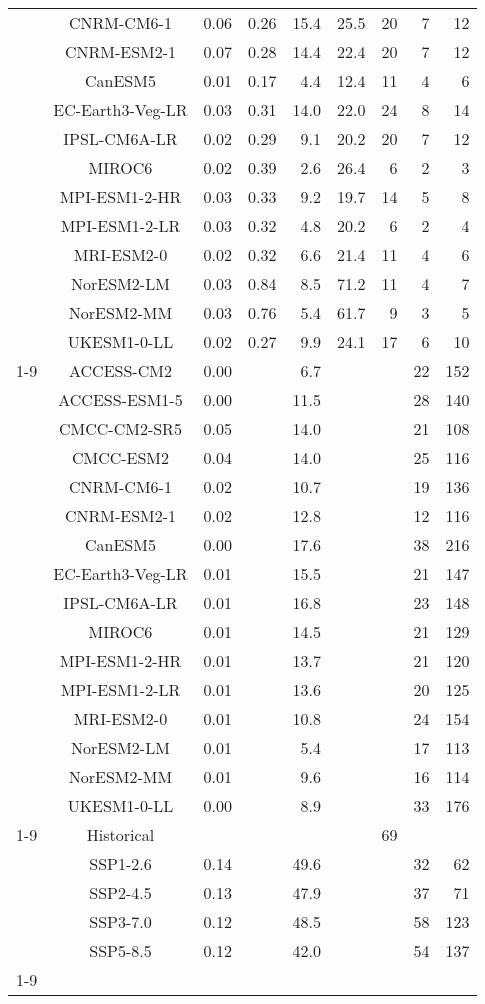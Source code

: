 \begin{table*}[t]
\begin{tabular}{c|c|rr|rr|rrr}
 & CNRM-CM6-1 & 0.06 & 0.26 & 15.4 & 25.5 & 20 & 7 & 12 \\
 & CNRM-ESM2-1 & 0.07 & 0.28 & 14.4 & 22.4 & 20 & 7 & 12 \\
 & CanESM5 & 0.01 & 0.17 & 4.4 & 12.4 & 11 & 4 & 6 \\
 & EC-Earth3-Veg-LR & 0.03 & 0.31 & 14.0 & 22.0 & 24 & 8 & 14 \\
 & IPSL-CM6A-LR & 0.02 & 0.29 & 9.1 & 20.2 & 20 & 7 & 12 \\
 & MIROC6 & 0.02 & 0.39 & 2.6 & 26.4 & 6 & 2 & 3 \\
 & MPI-ESM1-2-HR & 0.03 & 0.33 & 9.2 & 19.7 & 14 & 5 & 8 \\
 & MPI-ESM1-2-LR & 0.03 & 0.32 & 4.8 & 20.2 & 6 & 2 & 4 \\
 & MRI-ESM2-0 & 0.02 & 0.32 & 6.6 & 21.4 & 11 & 4 & 6 \\
 & NorESM2-LM & 0.03 & 0.84 & 8.5 & 71.2 & 11 & 4 & 7 \\
 & NorESM2-MM & 0.03 & 0.76 & 5.4 & 61.7 & 9 & 3 & 5 \\
 & UKESM1-0-LL & 0.02 & 0.27 & 9.9 & 24.1 & 17 & 6 & 10 \\
\cline{1-9}
\multirow[c]{16}{*}{Scenario uncertainty} & ACCESS-CM2 & 0.00 &  & 6.7 &  &  & 22 & 152 \\
 & ACCESS-ESM1-5 & 0.00 &  & 11.5 &  &  & 28 & 140 \\
 & CMCC-CM2-SR5 & 0.05 &  & 14.0 &  &  & 21 & 108 \\
 & CMCC-ESM2 & 0.04 &  & 14.0 &  &  & 25 & 116 \\
 & CNRM-CM6-1 & 0.02 &  & 10.7 &  &  & 19 & 136 \\
 & CNRM-ESM2-1 & 0.02 &  & 12.8 &  &  & 12 & 116 \\
 & CanESM5 & 0.00 &  & 17.6 &  &  & 38 & 216 \\
 & EC-Earth3-Veg-LR & 0.01 &  & 15.5 &  &  & 21 & 147 \\
 & IPSL-CM6A-LR & 0.01 &  & 16.8 &  &  & 23 & 148 \\
 & MIROC6 & 0.01 &  & 14.5 &  &  & 21 & 129 \\
 & MPI-ESM1-2-HR & 0.01 &  & 13.7 &  &  & 21 & 120 \\
 & MPI-ESM1-2-LR & 0.01 &  & 13.6 &  &  & 20 & 125 \\
 & MRI-ESM2-0 & 0.01 &  & 10.8 &  &  & 24 & 154 \\
 & NorESM2-LM & 0.01 &  & 5.4 &  &  & 17 & 113 \\
 & NorESM2-MM & 0.01 &  & 9.6 &  &  & 16 & 114 \\
 & UKESM1-0-LL & 0.00 &  & 8.9 &  &  & 33 & 176 \\
\cline{1-9}
\multirow[c]{5}{*}{Model uncertainty} & Historical &  &  &  &  & 69 &  &  \\
 & SSP1-2.6 & 0.14 &  & 49.6 &  &  & 32 & 62 \\
 & SSP2-4.5 & 0.13 &  & 47.9 &  &  & 37 & 71 \\
 & SSP3-7.0 & 0.12 &  & 48.5 &  &  & 58 & 123 \\
 & SSP5-8.5 & 0.12 &  & 42.0 &  &  & 54 & 137 \\
\cline{1-9}
\bottomrule
\end{tabular}
\end{table*}
